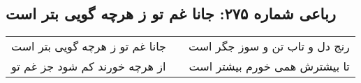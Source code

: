 \begin{center}
\section*{رباعی شماره ۲۷۵: جانا غم تو ز هرچه گویی بتر است}
\label{sec:0275}
\begin{longtable}{l p{0.5cm} r}
جانا غم تو ز هرچه گویی بتر است
&&
رنج دل و تاب تن و سوز جگر است
\\
از هرچه خورند کم شود جز غم تو
&&
تا بیشترش همی خورم بیشتر است
\\
\end{longtable}
\end{center}
